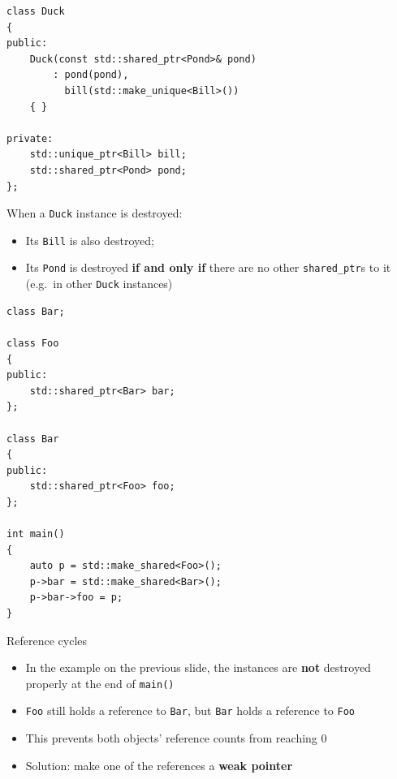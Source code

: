 \begin{frame}[fragile]
    \begin{lstlisting}
class Duck
{
public:
    Duck(const std::shared_ptr<Pond>& pond)
        : pond(pond),
          bill(std::make_unique<Bill>())
    { }
    
private:
    std::unique_ptr<Bill> bill;
    std::shared_ptr<Pond> pond;
};
    \end{lstlisting} \pause
    When a \lstinline{Duck} instance is destroyed: \pause
    \begin{itemize}
        \item Its \lstinline{Bill} is also destroyed; \pause
        \item Its \lstinline{Pond} is destroyed \textbf{if and only if} there are no other
            \lstinline{shared_ptr}s to it (e.g.\ in other \lstinline{Duck} instances)
    \end{itemize}
\end{frame}

\begin{frame}[fragile]
    \begin{lstlisting}
class Bar;

class Foo
{
public:
    std::shared_ptr<Bar> bar;
};

class Bar
{
public:
    std::shared_ptr<Foo> foo;
};

int main()
{
    auto p = std::make_shared<Foo>();
    p->bar = std::make_shared<Bar>();
    p->bar->foo = p;
}
    \end{lstlisting}
\end{frame}

\begin{frame}{Reference cycles}
    \begin{itemize}
        \item In the example on the previous slide,
            the instances are \textbf{not} destroyed properly at the end of \lstinline{main()} \pause
        \item \lstinline{Foo} still holds a reference to \lstinline{Bar},
            but \lstinline{Bar} holds a reference to \lstinline{Foo} \pause
        \item This prevents both objects' reference counts from reaching 0 \pause
        \item Solution: make one of the references a \textbf{weak pointer}
    \end{itemize}
\end{frame}


